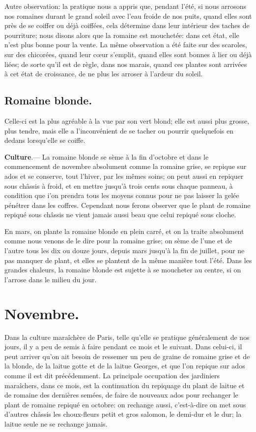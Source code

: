 \documentclass[10pt,a4paper]{book}
\begin{document}
Autre observation: la pratique nous a appris que, pendant l'été, si nous arrosons nos romaines durant le grand soleil avec l'eau froide de nos puits, quand elles sont près de se coiffer ou déjà coiffées, cela détermine dans leur intérieur des taches de pourriture; nous disons alors que la romaine est mouchetée: dans cet état, elle n'est plus bonne pour la vente. La même observation a été faite sur des scaroles, sur des chicorées, quand leur cœur s'emplit, quand elles sont bonnes à lier ou déjà liées; de sorte qu'il est de règle, dans nos marais, quand ces plantes sont arrivées à cet état de croissance, de ne plus les arroser à l'ardeur du soleil.

\subsection{Romaine blonde.}

Celle-ci est la plus agréable à la vue par son vert blond; elle est aussi plus grosse, plus tendre, mais elle a l'inconvénient de se tacher ou pourrir quelquefois en dedans lorsqu'elle se coiffe.

\textbf{Culture}.--- La romaine blonde se sème à la fin d'octobre et dans le commencement de novembre absolument comme la romaine grise, se repique sur ados et se conserve, tout l'hiver, par les mêmes soins; on peut aussi en repiquer sous châssis à froid, et en mettre jusqu'à trois cents sous chaque panneau, à condition que i'on prendra tous les moyens connus pour ne pas laisser la gelée pénétrer dans les coffres. Cependant nous ferons observer que le plant de romaine repiqué sous châssis ne vient jamais aussi beau que celui repiqué sous cloche.

En mars, on plante la romaine blonde en plein carré, et on la traite absolument comme nous venons de le dire pour la romaine grise; on sème de l'une et de l'autre tous les dix ou douze jours, depuis mars jusqu'à la fin de juillet, pour ne pas manquer de plant, et elles se plantent de la même manière tout l'été. Dans les grandes chaleurs, la romaine blonde est sujette à se moucheter au centre, si on l'arrose dans le milieu du jour.

\section{Novembre.}

Dans la culture maraîchère de Paris, telle qu'elle se pratique généralement de nos jours, il y a peu de semis à faire pendant ce mois et le suivant. Dans celui-ci, il peut arriver qu'on ait besoin de ressemer un peu de graine de romaine grise et de la blonde, de la laitue gotte et de la laitue Georges, et que l'on repique sur ados comme il est dit précédemment. La principale occupation des jardiniers maraîchers, dans ce mois, est la continuation du repiquage du plant de laitue et de romaine des dernières semées, de faire de nouveaux ados pour rechanger le plant de romaine repiqué en octobre: on rechange aussi, c'est-à-dire on met sous d'autres châssis les choux-fleurs petit et gros salomon, le demi-dur et le dur; la laitue seule ne se rechange jamais.
\end{document}
